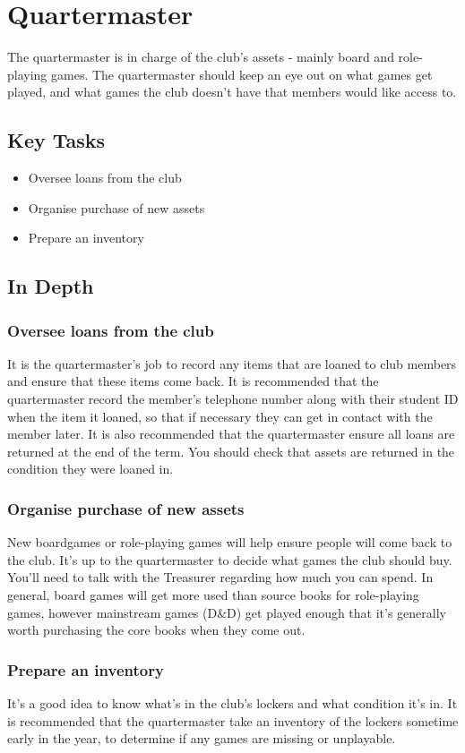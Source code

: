 \section{Quartermaster}
\label{sec:quartermaster}

The quartermaster is in charge of the club's assets - mainly board and role-playing games. The quartermaster should keep an eye out on what games get played, and what games the club doesn't have that members would like access to.

\subsection{Key Tasks}

\begin{itemize}
  \item Oversee loans from the club
  \item Organise purchase of new assets
  \item Prepare an inventory
\end{itemize}

\subsection{In Depth}

\subsubsection{Oversee loans from the club}

It is the quartermaster's job to record any items that are loaned to club members and ensure that these items come back. It is recommended that the quartermaster record the member's telephone number along with their student ID when the item it loaned, so that if necessary they can get in contact with the member later. It is also recommended that the quartermaster ensure all loans are returned at the end of the term. You should check that assets are returned in the condition they were loaned in.

\subsubsection{Organise purchase of new assets}

New boardgames or role-playing games will help ensure people will come back to the club. It's up to the quartermaster to decide what games the club should buy. You'll need to talk with the Treasurer regarding how much you can spend. In general, board games will get more used than source books for role-playing games, however mainstream games (\eg D\&D) get played enough that it's generally worth purchasing the core books when they come out.

\subsubsection{Prepare an inventory}

It's a good idea to know what's in the club's lockers and what condition it's in. It is recommended that the quartermaster take an inventory of the lockers sometime early in the year, to determine if any games are missing or unplayable.